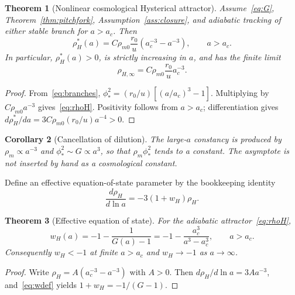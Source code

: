 \documentclass[11pt]{article}
\newtheorem{theorem}{Theorem}[section]
\newtheorem{corollary}[theorem]{Corollary}
\theoremstyle{definition}
\theoremstyle{remark}
\begin{document}
\begin{theorem}[Nonlinear cosmological Hysterical attractor]
\label{thm:attractor}
Assume~\eqref{eq:G}, Theorem~\ref{thm:pitchfork}, Assumption~\ref{ass:closure}, and adiabatic tracking of either stable branch for $a>a_c$.
Then
\begin{equation}
\label{eq:rhoH}
\boxed{
\rho_H^*(a)=C\rho_{m0}\frac{r_0}{u}
\left(a_c^{-3}-a^{-3}\right),\qquad a>a_c.
}
\end{equation}
In particular, $\rho_H^*(a)>0$, is strictly increasing in $a$, and has the finite limit
\begin{equation}
\label{eq:asymptote}
\boxed{\rho_{H,\infty}=C\rho_{m0}\frac{r_0}{u}a_c^{-3}.}
\end{equation}
\end{theorem}

\begin{proof}
From~\eqref{eq:branches}, $\phi_*^2=(r_0/u)[(a/a_c)^3-1]$.
Multiplying by $C\rho_{m0}a^{-3}$ gives~\eqref{eq:rhoH}.
Positivity follows from $a>a_c$; differentiation gives $d\rho_H^*/da=3C\rho_{m0}(r_0/u)a^{-4}>0$.
\end{proof}

\begin{corollary}[Cancellation of dilution]
\label{cor:cancellation}
The large-$a$ constancy is produced by $\rho_m\propto a^{-3}$ and $\phi_*^2\sim G\propto a^3$, so that $\rho_m\phi_*^2$ tends to a constant.
The asymptote is not inserted by hand as a cosmological constant.
\end{corollary}

Define an effective equation-of-state parameter by the bookkeeping identity
\begin{equation}
\label{eq:wdef}
\frac{d\rho_H}{d\ln a}=-3(1+w_H)\rho_H.
\end{equation}

\begin{theorem}[Effective equation of state]
\label{thm:w}
For the adiabatic attractor~\eqref{eq:rhoH},
\begin{equation}
\label{eq:w-attr}
\boxed{
w_H(a)=-1-\frac{1}{G(a)-1}
=-1-\frac{a_c^3}{a^3-a_c^3},\qquad a>a_c.
}
\end{equation}
Consequently $w_H<-1$ at finite $a>a_c$ and $w_H\to-1$ as $a\to\infty$.
\end{theorem}

\begin{proof}
Write $\rho_H=A(a_c^{-3}-a^{-3})$ with $A>0$.
Then $d\rho_H/d\ln a=3Aa^{-3}$, and~\eqref{eq:wdef} yields $1+w_H=-1/(G-1)$.
\end{proof}
\end{document}
